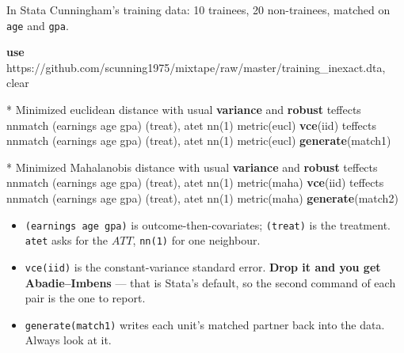\documentclass[
  11pt,
  ignorenonframetext,
  aspectratio=169,
]{beamer}
\newenvironment{Shaded}{\begin{snugshade}}{\end{snugshade}}
\newcommand{\CommentTok}[1]{\textcolor[rgb]{0.37,0.37,0.37}{#1}}
\newcommand{\KeywordTok}[1]{\textcolor[rgb]{0.00,0.23,0.31}{\textbf{#1}}}
\newcommand{\NormalTok}[1]{\textcolor[rgb]{0.00,0.23,0.31}{#1}}
\providecommand{\tightlist}{%
  \setlength{\itemsep}{0pt}\setlength{\parskip}{0pt}}
\begin{document}
\begin{frame}[fragile]{In Stata}
\protect{}\label{in-stata}
Cunningham's training data: 10 trainees, 20 non-trainees, matched on
\texttt{age} and \texttt{gpa}.

\footnotesize

\begin{Shaded}
\begin{Highlighting}[]
\KeywordTok{use}\NormalTok{ https:}\CommentTok{//github.com/scunning1975/mixtape/raw/master/training\_inexact.dta, clear}

\NormalTok{* Minimized euclidean distance with usual }\KeywordTok{variance}\NormalTok{ and }\KeywordTok{robust}
\NormalTok{teffects nnmatch (earnings age gpa) (treat), atet nn(1) metric(eucl) }\KeywordTok{vce}\NormalTok{(iid)}
\NormalTok{teffects nnmatch (earnings age gpa) (treat), atet nn(1) metric(eucl) }\KeywordTok{generate}\NormalTok{(match1)}

\NormalTok{* Minimized Mahalanobis distance with usual }\KeywordTok{variance}\NormalTok{ and }\KeywordTok{robust}
\NormalTok{teffects nnmatch (earnings age gpa) (treat), atet nn(1) metric(maha) }\KeywordTok{vce}\NormalTok{(iid)}
\NormalTok{teffects nnmatch (earnings age gpa) (treat), atet nn(1) metric(maha) }\KeywordTok{generate}\NormalTok{(match2)}
\end{Highlighting}
\end{Shaded}

\normalsize

\begin{itemize}
\tightlist
\item
  \texttt{(earnings\ age\ gpa)} is outcome-then-covariates;
  \texttt{(treat)} is the treatment. \texttt{atet} asks for the \(ATT\),
  \texttt{nn(1)} for one neighbour.
\item
  \texttt{vce(iid)} is the constant-variance standard error.
  \textbf{Drop it and you get Abadie--Imbens} --- that is Stata's
  default, so the second command of each pair is the one to report.
\item
  \texttt{generate(match1)} writes each unit's matched partner back into
  the data. Always look at it.
\end{itemize}
\end{frame}
\end{document}
